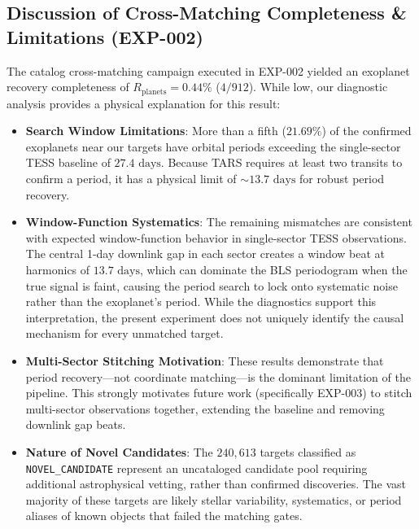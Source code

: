 \subsection{Discussion of Cross-Matching Completeness \& Limitations (EXP-002)} \label{sec:disc_exp2}
The catalog cross-matching campaign executed in EXP-002 yielded an exoplanet recovery completeness of $R_{\text{planets}} = 0.44\%$ ($4 / 912$). While low, our diagnostic analysis provides a physical explanation for this result:
\begin{itemize}
    \item \textbf{Search Window Limitations}: More than a fifth ($21.69\%$) of the confirmed exoplanets near our targets have orbital periods exceeding the single-sector TESS baseline of $27.4\text{ days}$. Because TARS requires at least two transits to confirm a period, it has a physical limit of $\sim 13.7\text{ days}$ for robust period recovery.
    \item \textbf{Window-Function Systematics}: The remaining mismatches are consistent with expected window-function behavior in single-sector TESS observations. The central 1-day downlink gap in each sector creates a window beat at harmonics of $13.7\text{ days}$, which can dominate the BLS periodogram when the true signal is faint, causing the period search to lock onto systematic noise rather than the exoplanet's period. While the diagnostics support this interpretation, the present experiment does not uniquely identify the causal mechanism for every unmatched target.
    \item \textbf{Multi-Sector Stitching Motivation}: These results demonstrate that period recovery—not coordinate matching—is the dominant limitation of the pipeline. This strongly motivates future work (specifically EXP-003) to stitch multi-sector observations together, extending the baseline and removing downlink gap beats.
    \item \textbf{Nature of Novel Candidates}: The $240,613$ targets classified as \texttt{NOVEL\_CANDIDATE} represent an uncataloged candidate pool requiring additional astrophysical vetting, rather than confirmed discoveries. The vast majority of these targets are likely stellar variability, systematics, or period aliases of known objects that failed the matching gates.
\end{itemize}

